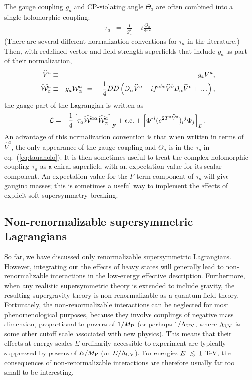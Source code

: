 \documentclass[11pt]{article}
\def\beq{\begin{eqnarray}}
\def\eeq{\end{eqnarray}}
\def\MPlanck{M_{\rm P}}
\def\Dcon{\overline D}
\def\centeron#1#2{{\setbox0=\hbox{#1}\setbox1=\hbox{#2}\ifdim
\wd1>\wd0\kern.5\wd1\kern-.5\wd0\fi
\copy0\kern-.5\wd0\kern-.5\wd1\copy1\ifdim\wd0>\wd1
\kern.5\wd0\kern-.5\wd1\fi}}
\def\ltap{\;\centeron{\raise.35ex\hbox{$<$}}{\lower.65ex\hbox{$\sim$}}\;}
\def\lsim{\mathrel{\ltap}}
\begin{document}
The gauge coupling $g_a$ and CP-violating angle $\Theta_a$ are often 
combined into a single holomorphic
coupling:
\beq
\tau_a &=& \frac{1}{g_a^2} -i \frac{\Theta_a}{8 \pi^2}
\eeq
(There are several different normalization conventions for $\tau_a$ in the literature.)
Then, with redefined
vector and field strength superfields that include $g_a$ as part of their normalization,
\beq
\widehat V^{a} &\equiv& g_a V^{a},
\label{eq:holonorm}
\\
\widehat {\cal W}^{a}_{\alpha} &\equiv& 
g_a {\cal W}^{a}_{\alpha}
\>\,=\>\,
-\frac{1}{4} \Dcon\Dcon \left (
D_\alpha \widehat V^a - i f^{abc} \widehat V^b D_\alpha \widehat V^c + \ldots \right ) 
,
\label{eq:holonormW}
\eeq
the gauge part of the Lagrangian is written as
\beq
{\cal L} &=& 
\frac{1}{4} 
\left [ \tau_a \widehat{\cal W}^{a \alpha}\widehat{\cal W}^{a}_{\alpha} \right ]_F 
+ {\rm c.c.}  + 
\left [
\Phi^{*i} (e^{2 T^a \widehat V^a})_i{}^j \Phi_j \right]_D .
\label{eq:tauaholo}
\eeq
An advantage of this normalization convention is that 
when written in terms of $\widehat V^a$, the only appearance of the gauge coupling
and $\Theta_a$ is in the $\tau_a$ in eq.~(\ref{eq:tauaholo}).
It is then sometimes useful to treat the complex holomorphic coupling $\tau_a$ 
as a 
chiral superfield with an expectation value for its scalar component. 
An expectation value for the 
$F$-term component of $\tau_a$ will give gaugino masses; 
this is sometimes
a useful way to implement the effects of explicit soft supersymmetry breaking.

\subsection{Non-renormalizable 
supersymmetric Lagrangians\label{superspacenonrenorm}}
\setcounter{equation}{0}
\setcounter{footnote}{2}

So far, we have discussed only renormalizable supersymmetric Lagrangians. 
However, integrating out the effects
of heavy states will generally lead to
non-renormalizable interactions in the low-energy 
effective description. Furthermore,  
when any realistic supersymmetric theory is extended to include gravity, 
the resulting supergravity theory is 
non-renormalizable as a quantum field theory. Fortunately, 
the non-renormalizable interactions can be neglected 
for most phenomenological purposes, because they 
involve couplings of negative mass dimension, proportional to 
powers of $1/\MPlanck$ (or perhaps $1/\Lambda_{\rm UV}$, where 
$\Lambda_{\rm UV}$ is some other cutoff scale associated with new 
physics). This means that their effects at energy scales $E$ ordinarily 
accessible to experiment are typically suppressed by powers of 
${E/\MPlanck}$ (or $E/\Lambda_{\rm UV}$). For energies 
$E\lsim 1$ TeV, the consequences of non-renormalizable interactions are 
therefore usually far too small to be interesting.
\end{document}
